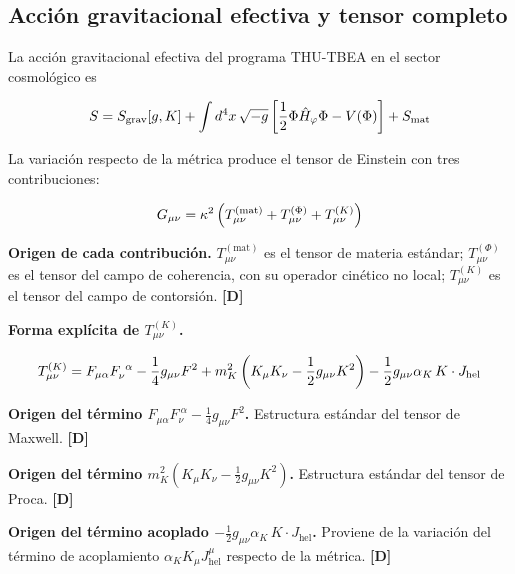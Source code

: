 ﻿\documentclass[11pt,letterpaper]{article}
\begin{document}
\subsection{Acción gravitacional efectiva y tensor completo}
La acción gravitacional efectiva del programa THU-TBEA en el sector cosmológico es

\begin{equation*}
  \resizebox{\ifdim\width>\linewidth \linewidth\else\width\fi}{!}{$\displaystyle S = S_{\text{grav}}[g, K] + \int d^4x\,\sqrt{-g}\left[\frac{1}{2}\Phi\hat{H}_\varphi\Phi - V(\Phi)\right] + S_{\text{mat}}$}
\end{equation*}

La variación respecto de la métrica produce el tensor de Einstein con tres contribuciones:

\begin{equation*}
  \resizebox{\ifdim\width>\linewidth \linewidth\else\width\fi}{!}{$\displaystyle G_{\mu\nu} = \kappa^2\left(T_{\mu\nu}^{(\text{mat})} + T_{\mu\nu}^{(\Phi)} + T_{\mu\nu}^{(K)}\right)$}
\end{equation*}

\textbf{Origen de cada contribución.} $T_{\mu\nu}^{(\text{mat})}$ es el tensor de materia estándar; $T_{\mu\nu}^{(\Phi)}$ es el tensor del campo de coherencia, con su operador cinético no local; $T_{\mu\nu}^{(K)}$ es el tensor del campo de contorsión. \textbf{[D]}

\textbf{Forma explícita de $T_{\mu\nu}^{(K)}$.}

\begin{equation*}
  \resizebox{\ifdim\width>\linewidth \linewidth\else\width\fi}{!}{$\displaystyle T_{\mu\nu}^{(K)} = F_{\mu\alpha}F_\nu^{\ \alpha} - \frac{1}{4}g_{\mu\nu}F^2 + m_K^2\left(K_\mu K_\nu - \frac{1}{2}g_{\mu\nu}K^2\right) - \frac{1}{2}g_{\mu\nu}\alpha_K\,K\cdot J_{\text{hel}}$}
\end{equation*}

\textbf{Origen del término $F_{\mu\alpha}F_\nu^{\ \alpha} - \frac{1}{4}g_{\mu\nu}F^2$.} Estructura estándar del tensor de Maxwell. \textbf{[D]}

\textbf{Origen del término $m_K^2(K_\mu K_\nu - \frac{1}{2}g_{\mu\nu}K^2)$.} Estructura estándar del tensor de Proca. \textbf{[D]}

\textbf{Origen del término acoplado $-\frac{1}{2}g_{\mu\nu}\alpha_K\,K\cdot J_{\text{hel}}$.} Proviene de la variación del término de acoplamiento $\alpha_K K_\mu J_{\text{hel}}^\mu$ respecto de la métrica. \textbf{[D]}
\end{document}
